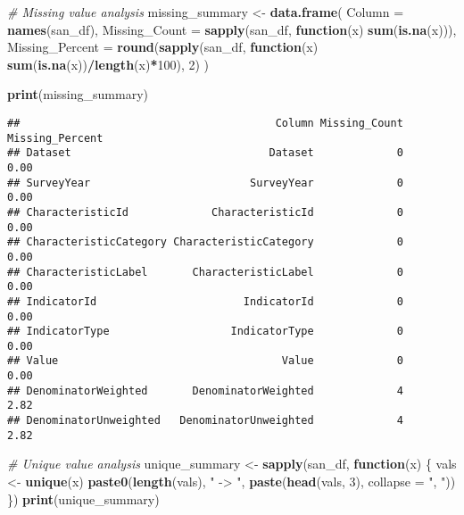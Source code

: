 \documentclass[
]{article}
\newenvironment{Shaded}{\begin{snugshade}}{\end{snugshade}}
\newcommand{\AttributeTok}[1]{\textcolor[rgb]{0.13,0.29,0.53}{#1}}
\newcommand{\CommentTok}[1]{\textcolor[rgb]{0.56,0.35,0.01}{\textit{#1}}}
\newcommand{\ControlFlowTok}[1]{\textcolor[rgb]{0.13,0.29,0.53}{\textbf{#1}}}
\newcommand{\DecValTok}[1]{\textcolor[rgb]{0.00,0.00,0.81}{#1}}
\newcommand{\FunctionTok}[1]{\textcolor[rgb]{0.13,0.29,0.53}{\textbf{#1}}}
\newcommand{\NormalTok}[1]{#1}
\newcommand{\OtherTok}[1]{\textcolor[rgb]{0.56,0.35,0.01}{#1}}
\newcommand{\SpecialCharTok}[1]{\textcolor[rgb]{0.81,0.36,0.00}{\textbf{#1}}}
\newcommand{\StringTok}[1]{\textcolor[rgb]{0.31,0.60,0.02}{#1}}
\begin{document}
\begin{Shaded}
\begin{Highlighting}[]
\CommentTok{\# Missing value analysis}
\NormalTok{missing\_summary }\OtherTok{\textless{}{-}} \FunctionTok{data.frame}\NormalTok{(}
  \AttributeTok{Column =} \FunctionTok{names}\NormalTok{(san\_df),}
  \AttributeTok{Missing\_Count =} \FunctionTok{sapply}\NormalTok{(san\_df, }\ControlFlowTok{function}\NormalTok{(x) }\FunctionTok{sum}\NormalTok{(}\FunctionTok{is.na}\NormalTok{(x))),}
  \AttributeTok{Missing\_Percent =} \FunctionTok{round}\NormalTok{(}\FunctionTok{sapply}\NormalTok{(san\_df, }\ControlFlowTok{function}\NormalTok{(x) }\FunctionTok{sum}\NormalTok{(}\FunctionTok{is.na}\NormalTok{(x))}\SpecialCharTok{/}\FunctionTok{length}\NormalTok{(x)}\SpecialCharTok{*}\DecValTok{100}\NormalTok{), }\DecValTok{2}\NormalTok{)}
\NormalTok{)}

\FunctionTok{print}\NormalTok{(missing\_summary)}
\end{Highlighting}
\end{Shaded}

\begin{verbatim}
##                                        Column Missing_Count Missing_Percent
## Dataset                               Dataset             0            0.00
## SurveyYear                         SurveyYear             0            0.00
## CharacteristicId             CharacteristicId             0            0.00
## CharacteristicCategory CharacteristicCategory             0            0.00
## CharacteristicLabel       CharacteristicLabel             0            0.00
## IndicatorId                       IndicatorId             0            0.00
## IndicatorType                   IndicatorType             0            0.00
## Value                                   Value             0            0.00
## DenominatorWeighted       DenominatorWeighted             4            2.82
## DenominatorUnweighted   DenominatorUnweighted             4            2.82
\end{verbatim}

\begin{Shaded}
\begin{Highlighting}[]
\CommentTok{\# Unique value analysis}
\NormalTok{unique\_summary }\OtherTok{\textless{}{-}} \FunctionTok{sapply}\NormalTok{(san\_df, }\ControlFlowTok{function}\NormalTok{(x) \{}
\NormalTok{  vals }\OtherTok{\textless{}{-}} \FunctionTok{unique}\NormalTok{(x)}
  \FunctionTok{paste0}\NormalTok{(}\FunctionTok{length}\NormalTok{(vals), }\StringTok{" {-}\textgreater{} "}\NormalTok{, }\FunctionTok{paste}\NormalTok{(}\FunctionTok{head}\NormalTok{(vals, }\DecValTok{3}\NormalTok{), }\AttributeTok{collapse =} \StringTok{", "}\NormalTok{))}
\NormalTok{\})}
\FunctionTok{print}\NormalTok{(unique\_summary)}
\end{Highlighting}
\end{Shaded}
\end{document}

